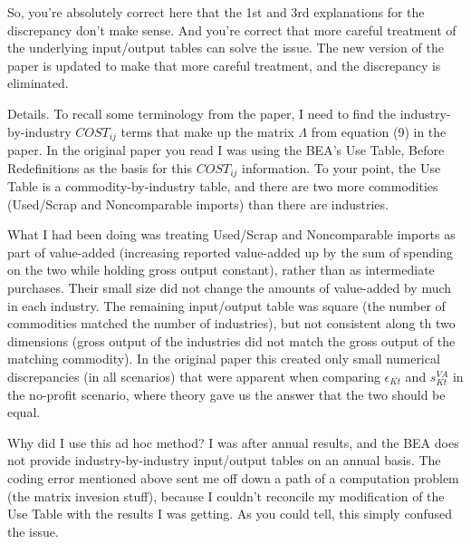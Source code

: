 \documentclass[11pt]{article}
\begin{document}
So, you're absolutely correct here that the 1st and 3rd explanations for the discrepancy don't make sense. And you're correct that more careful treatment of the underlying input/output tables can solve the issue. The new version of the paper is updated to make that more careful treatment, and the discrepancy is eliminated. 

Details. To recall some terminology from the paper, I need to find the industry-by-industry $COST_{ij}$ terms that make up the matrix $\Lambda$ from equation (9) in the paper. In the original paper you read I was using the BEA's Use Table, Before Redefinitions as the basis for this $COST_{ij}$ information. To your point, the Use Table is a commodity-by-industry table, and there are two more commodities (Used/Scrap and Noncomparable imports) than there are industries. 

What I had been doing was treating Used/Scrap and Noncomparable imports as part of value-added (increasing reported value-added up by the sum of spending on the two while holding gross output constant), rather than as intermediate purchases. Their small size did not change the amounts of value-added by much in each industry. The remaining input/output table was square (the number of commodities matched the number of industries), but not consistent along th two dimensions (gross output of the industries did not match the gross output of the matching commodity). In the original paper this created only small numerical discrepancies (in all scenarios) that were apparent when comparing $\epsilon_{Kt}$ and $s_{Kt}^{VA}$ in the no-profit scenario, where theory gave us the answer that the two should be equal.

Why did I use this ad hoc method? I was after annual results, and the BEA does not provide industry-by-industry input/output tables on an annual basis. The coding error mentioned above sent me off down a path of a computation problem (the matrix invesion stuff), because I couldn't reconcile my modification of the Use Table with the results I was getting. As you could tell, this simply confused the issue. 
\end{document}
